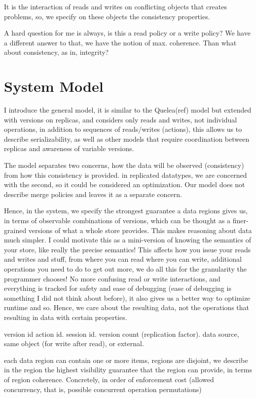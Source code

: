 \documentclass[preprint]{sigplanconf}
\begin{document}
It is the interaction of reads and writes on conflicting objects that creates
problems, so, we specify on these objects the consistency properties.

A hard question for me is always, is this a read policy or a write policy?
We have a different answer to that, we have the notion of max. coherence.
Than what about consistency, as in, integrity?

\section{System Model}
I introduce the general model, it is similar to the Quelea(ref) model but extended
with versions on replicas, and considers only reads and writes, not individual
operations, in addition to sequences of reads/writes (actions), this allows us
to describe serializability, as well as other models that require coordination
between replicas and awareness of variable versions.

The model separates two concerns, how the data will be observed (consistency)
from how this consistency is provided. in replicated datatypes, we are concerned
with the second, so it could be considered an optimization. Our model does not
describe merge policies and leaves it as a separate concern.

Hence, in the system, we specify the strongest guarantee a data regions gives
us, in terms of observable combinations of versions, which can be thought as a
finer-grained versions of what a whole store provides. This makes reasoning about data much simpler.
I could motivate this as a mini-version of knowing the semantics of your store,
like really the precise semantics! This affects how you issue your reads and
writes and stuff, from where you can read where you can write, additional
operations you need to do to get out more, we do all this for the granularity
the programmer chooses! No more confusing read or write interactions, and
everything is tracked for safety and ease of debugging (ease of debugging is
something I did not think about before), it also gives us a better way to
optimize runtime and so. Hence, we care about the resulting data, not the
operations that resulting in data with certain properties.


version id 
action id.
session id.
version count (replication factor).
data source, same object (for write after read), or external.

each data region can contain one or more items, regions are disjoint, we
describe in the region the highest visibility guarantee that the region can
provide, in terms of region coherence. Concretely, in order of enforcement cost
(allowed concurrency, that is, possible concurrent operation permutations)
\end{document}
